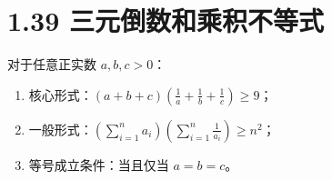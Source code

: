 \documentclass{article}
\begin{document}
\section*{1.39 三元倒数和乘积不等式}
对于任意正实数 \( a,b,c>0 \)：
\begin{enumerate}
    \item 核心形式：\( (a+b+c)\left(\frac{1}{a}+\frac{1}{b}+\frac{1}{c}\right) \geq 9 \)；
    \item 一般形式：\( \left(\sum_{i=1}^n a_i\right)\left(\sum_{i=1}^n \frac{1}{a_i}\right) \geq n^2 \)；
    \item 等号成立条件：当且仅当 \( a=b=c \)。
\end{enumerate}
\end{document}
